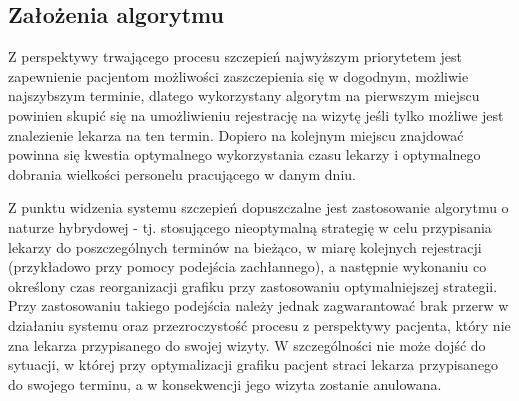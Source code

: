 \documentclass[a4paper,12pt,polish]{article}
\begin{document}
\subsection{Założenia algorytmu}
Z perspektywy trwającego procesu szczepień najwyższym priorytetem jest zapewnienie pacjentom możliwości zaszczepienia się w dogodnym, możliwie najszybszym terminie, dlatego wykorzystany algorytm na pierwszym miejscu powinien skupić się na umożliwieniu rejestrację na wizytę jeśli tylko możliwe jest znalezienie lekarza na ten termin. Dopiero na kolejnym miejscu znajdować powinna się kwestia optymalnego wykorzystania czasu lekarzy i optymalnego dobrania wielkości personelu pracującego w danym dniu.

Z punktu widzenia systemu szczepień dopuszczalne jest zastosowanie algorytmu o naturze hybrydowej - tj. stosującego nieoptymalną strategię w celu przypisania lekarzy do poszczególnych terminów na bieżąco, w miarę kolejnych rejestracji (przykładowo przy pomocy podejścia zachłannego), a następnie wykonaniu co określony czas reorganizacji grafiku przy zastosowaniu optymalniejszej strategii. Przy zastosowaniu takiego podejścia należy jednak zagwarantować brak przerw w działaniu systemu oraz przezroczystość procesu z perspektywy pacjenta, który nie zna lekarza przypisanego do swojej wizyty. W szczególności nie może dojść do sytuacji, w której przy optymalizacji grafiku pacjent straci lekarza przypisanego do swojego terminu, a w konsekwencji jego wizyta zostanie anulowana.
\end{document}
